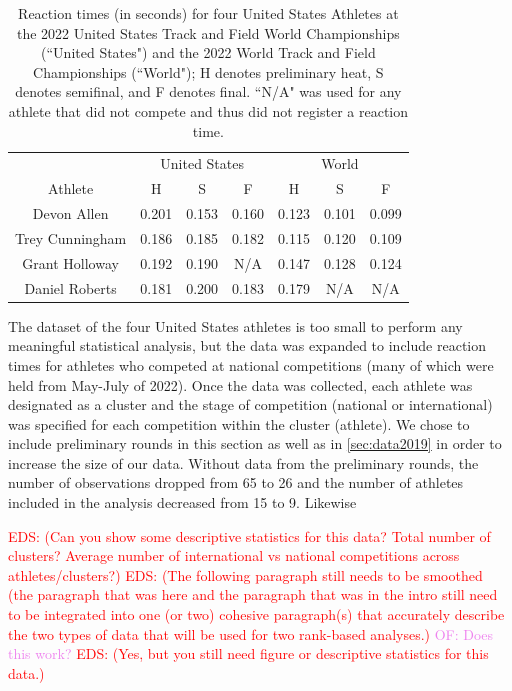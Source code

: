 \documentclass[12pt, letterpaper, titlepage]{article}
\newcommand{\eds}[1]{\textcolor{red}{EDS: (#1)}}
\newcommand{\of}[1]{\textcolor{violet}{OF: #1}}
\begin{document}
\begin{table}
\begin{center}
  \caption{Reaction times (in seconds) for four United States Athletes at the 
	2022 United States Track
  and Field World Championships (``United States") and the 2022 World Track and Field 
	Championships (``World"); H denotes preliminary heat, S denotes semifinal, and 
	F denotes final.
  ``N/A" was used for any athlete that did not compete and thus did not register 
  a reaction time. }
  \begin{tabular}{c c c c c c c} 
   \toprule
	 & \multicolumn{3}{c}{United States} & \multicolumn{3}{c}{World} \\
	\cmidrule(lr){2-4}
    \cmidrule(lr){5-7}
   Athlete &  H &  S &  F &  H &  S &  F \\ [0.5ex] 
   \midrule
   Devon Allen & 0.201 & 0.153 & 0.160 & 0.123 & 0.101 & 0.099 \\ 
   Trey Cunningham & 0.186 & 0.185 & 0.182 & 0.115 & 0.120 & 0.109 \\
   Grant Holloway & 0.192 & 0.190 & N/A & 0.147 & 0.128 & 0.124 \\
   Daniel Roberts & 0.181 & 0.200 & 0.183 & 0.179 & N/A & N/A \\ [0.5ex]
   \bottomrule
  \end{tabular}
  \label{fig:USAvsWorld}
  
\end{center}
\end{table}

The dataset of the four United States athletes 
is too small to perform any meaningful statistical analysis, but
the data was expanded to include reaction times for athletes who competed at 
national competitions (many of which were held from May-July of 2022). Once the 
data was collected, each athlete was designated as a cluster and the stage of
competition (national or international) was specified for each competition 
within the cluster (athlete).  We chose to include preliminary rounds in this
section as well as in \ref{sec:data2019} in order to increase the size of our
data.  Without data from the preliminary rounds, the number of observations
dropped from 65 to 26 and the number of athletes included in the analysis
decreased from 15 to 9.  Likewise 



\eds{Can you show some descriptive statistics for this data?  Total number of 
clusters? Average number of international vs national competitions across 
athletes/clusters?}
\eds{The following paragraph still needs to be smoothed (the paragraph that was 
here and the paragraph that was in the intro still need to be integrated into 
one (or two) cohesive paragraph(s) that accurately describe the two types of 
data that will be used for two rank-based analyses.}
\of{Does this work?}
\eds{Yes, but you still need figure or descriptive statistics for this data.} 
\end{document}
